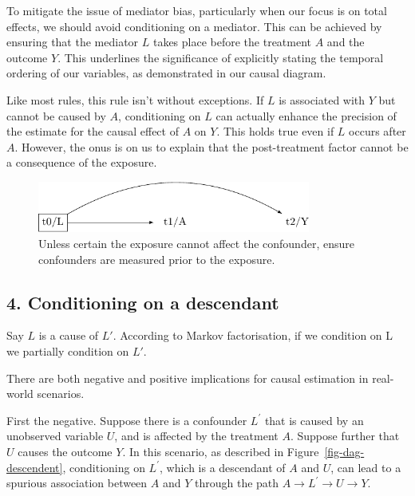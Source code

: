 \documentclass[
  singlecolumn]{report}
\begin{document}
To mitigate the issue of mediator bias, particularly when our focus is
on total effects, we should avoid conditioning on a mediator. This can
be achieved by ensuring that the mediator \(L\) takes place before the
treatment \(A\) and the outcome \(Y\). This underlines the significance
of explicitly stating the temporal ordering of our variables, as
demonstrated in our causal diagram.

Like most rules, this rule isn't without exceptions. If \(L\) is
associated with \(Y\) but cannot be caused by \(A\), conditioning on
\(L\) can actually enhance the precision of the estimate for the causal
effect of \(A\) on \(Y\). This holds true even if \(L\) occurs after
\(A\). However, the onus is on us to explain that the post-treatment
factor cannot be a consequence of the exposure.

\begin{figure}

{\centering \includegraphics[width=0.8\textwidth,height=\textheight]{causal-dags_files/figure-pdf/fig-dag-mediator-solution-1.pdf}

}

\caption{\label{fig-dag-mediator-solution}Unless certain the exposure
cannot affect the confounder, ensure confounders are measured prior to
the exposure.}

\end{figure}

\hypertarget{conditioning-on-a-descendant}{%
\subsection{4. Conditioning on a
descendant}\label{conditioning-on-a-descendant}}

Say \(L\) is a cause of \(L\prime\). According to Markov factorisation,
if we condition on L we partially condition on \(L\prime\).

There are both negative and positive implications for causal estimation
in real-world scenarios.

First the negative. Suppose there is a confounder \(L^\prime\) that is
caused by an unobserved variable \(U\), and is affected by the treatment
\(A\). Suppose further that \(U\) causes the outcome \(Y\). In this
scenario, as described in Figure~\ref{fig-dag-descendent}, conditioning
on \(L^\prime\), which is a descendant of \(A\) and \(U\), can lead to a
spurious association between \(A\) and \(Y\) through the path
\(A \to L^\prime \to U \to Y\).
\end{document}
